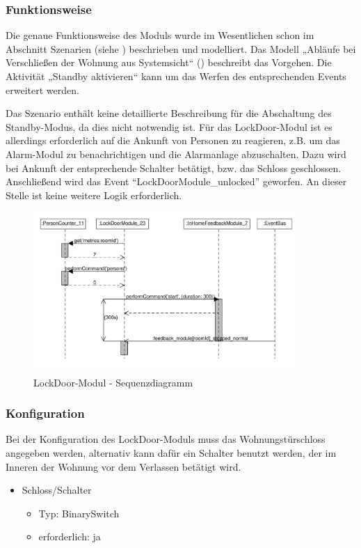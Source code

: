 \subsubsection{Funktionsweise}
Die genaue Funktionsweise des Moduls wurde im Wesentlichen schon im Abschnitt Szenarien (siehe ) beschrieben und modelliert. Das Modell „Abläufe bei Verschließen der Wohnung aus Systemsicht“ () beschreibt das Vorgehen. Die Aktivität „Standby aktivieren“ kann um das Werfen des entsprechenden Events erweitert werden.

Das Szenario enthält keine detaillierte Beschreibung für die Abschaltung des Standby-Modus, da dies nicht notwendig ist. Für das LockDoor-Modul ist es allerdings erforderlich auf die Ankunft von Personen zu reagieren, z.B. um das Alarm-Modul zu benachrichtigen und die Alarmanlage abzuschalten. %
Dazu wird bei Ankunft der entsprechende Schalter betätigt, bzw. das Schloss geschlossen. Anschließend wird das Event "`LockDoorModule\_unlocked"' geworfen. An dieser Stelle ist keine weitere Logik erforderlich.

\begin{figure}[h!]
	\centering
	\includegraphics[width=0.9\textwidth]{img/Modulkonzeption/LockDoorSequence.pdf}
	\caption{LockDoor-Modul - Sequenzdiagramm}
	\label{fig:modulkonzeptionLockDoorSequence}
\end{figure}

\subsubsection{Konfiguration}
Bei der Konfiguration des LockDoor-Moduls muss das Wohnungstürschloss angegeben werden, alternativ kann dafür ein Schalter benutzt werden, der im Inneren der Wohnung vor dem Verlassen betätigt wird. 
\begin{itemize}
	\item Schloss/Schalter
	\begin{itemize}
		\item Typ: BinarySwitch
		\item erforderlich: ja
	\end{itemize}
\end{itemize}

